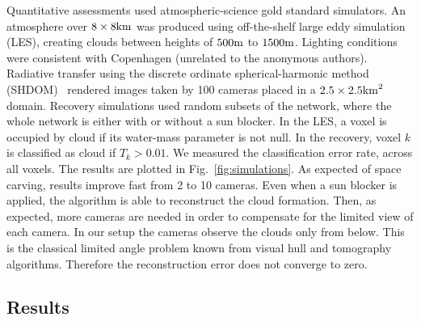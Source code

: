 \documentclass[runningheads]{llncs}
\begin{document}
Quantitative assessments used atmospheric-science gold standard
simulators.  An atmosphere over $8\times8{\rm km}$ was produced using
off-the-shelf large eddy simulation (LES), creating clouds between
heights of $500{\rm m}$ to $1500{\rm m}$.  Lighting conditions were
consistent with Copenhagen (unrelated to the anonymous authors).
Radiative transfer using the discrete ordinate spherical-harmonic
method (SHDOM)~\cite{Evans1998} rendered images taken by 100 cameras
placed in a $2.5\times 2.5{\rm km}^2$ domain. Recovery simulations
used random subsets of the network, where the whole network is either
with or without a sun blocker. In the LES, a voxel is occupied by
cloud if its water-mass parameter is not null. In the recovery, voxel
$k$ is classified as cloud if $T_k>0.01$.  We measured the
classification error rate, across all voxels.
The results are plotted in Fig.~\ref{fig:simulations}.  As expected of
space carving, results improve fast from 2 to 10 cameras. Even when a
sun blocker is applied, the algorithm is able to reconstruct the cloud
formation. Then, as expected, more cameras are needed in order to
compensate for the limited view of each camera. In our setup the
cameras observe the clouds only from below. This is the classical
limited angle problem known from visual hull and tomography
algorithms. Therefore the reconstruction error does not converge to
zero.

\subsection{Results}
\end{document}
